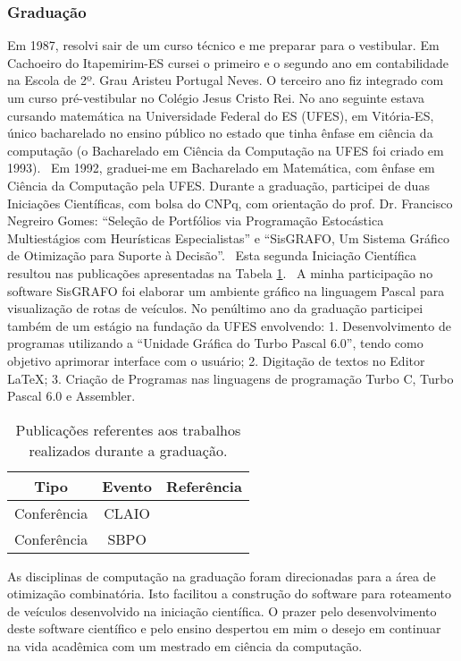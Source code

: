 \subsubsection{Graduação}

Em 1987, resolvi sair de um curso técnico e me preparar para o vestibular. Em Cachoeiro do Itapemirim-ES cursei o primeiro e o segundo ano em contabilidade na Escola de 2º. Grau Aristeu Portugal Neves. O terceiro ano fiz integrado com um curso pré-vestibular no Colégio Jesus Cristo Rei. No ano seguinte estava cursando matemática na Universidade Federal do ES (UFES), em  Vitória-ES, único bacharelado no ensino público no estado que tinha ênfase em ciência da computação (o Bacharelado em Ciência da Computação na UFES foi criado em 1993).
\ 	
Em 1992, graduei-me em Bacharelado em Matemática, com ênfase em Ciência da Computação pela UFES. Durante a graduação, participei de duas Iniciações Científicas, com bolsa do CNPq, com orientação do prof. Dr. Francisco Negreiro Gomes:
``Seleção de Portfólios via Programação Estocástica Multiestágios com Heurísticas Especialistas'' e
``SisGRAFO, Um Sistema Gráfico de Otimização para Suporte à Decisão''.
\
Esta segunda Iniciação Científica resultou nas publicações apresentadas na Tabela \ref{tab:tabelaG}.
\
A minha participação no software SisGRAFO foi elaborar um ambiente gráfico na linguagem Pascal para visualização de rotas de veículos. No penúltimo ano da graduação participei também de um estágio na fundação da UFES envolvendo: 1. Desenvolvimento de programas utilizando a ``Unidade Gráfica do Turbo Pascal 6.0'', tendo como objetivo aprimorar interface com o usuário; 2. Digitação de textos no Editor \LaTeX; 3. Criação de Programas nas linguagens de programação Turbo C, Turbo Pascal 6.0 e Assembler.

\begin{table}[!ht]
   \centering
   \caption{Publicações referentes aos trabalhos realizados durante a graduação.}\label{tab:tabelaG}
\begin{tabular}{|c|c|c|}
\hline
\textbf{Tipo} & \textbf{Evento} & \textbf{Referência} \\ \hline
  Conferência & CLAIO &  \cite{1992:Gomes.Gomes.ea} \\ \hline
  Conferência & SBPO &  \cite{1992:Gomes.Gomes.ea*1} \\ \hline
\end{tabular}
\end{table}

As disciplinas de computação na graduação foram direcionadas para a área de otimização combinatória. Isto facilitou a construção do software para roteamento de veículos desenvolvido na iniciação científica. O prazer pelo desenvolvimento deste software científico e pelo ensino despertou em mim o desejo em continuar na vida acadêmica com um mestrado em ciência da computação. 

